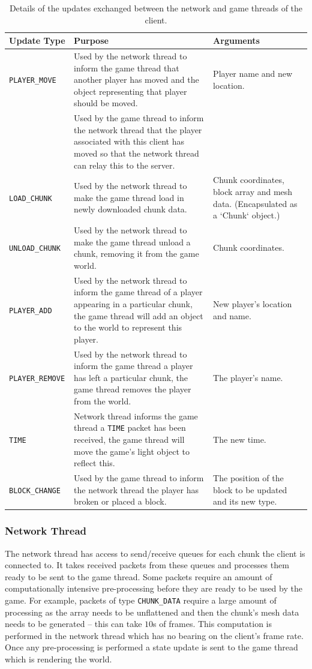 \documentclass[10pt,twoside,notitlepage,a4paper]{report}
\begin{document}
	\begin{table}
		\begin{tabularx}{\textwidth}{| l | X | p{3cm} |}
			\hline
			\bf Update Type & Purpose & Arguments \\
			\hline
			\tt PLAYER\_MOVE & Used by the network thread to inform the game thread that another player has moved and the object representing that player should be moved. & Player name and new location.\\
			\cline{2-2}
			\tt & Used by the game thread to inform the network thread that the player associated with this client has moved so that the network thread can relay this to the server. & \\
			\hline
			\tt LOAD\_CHUNK & Used by the network thread to make the game thread load in newly downloaded chunk data. & Chunk coordinates, block array and mesh data. (Encapsulated as a `Chunk` object.) \\
			\hline
			\tt UNLOAD\_CHUNK & Used by the network thread to make the game thread unload a chunk, removing it from the game world. & Chunk coordinates. \\
			\hline
			\tt PLAYER\_ADD & Used by the network thread to inform the game thread of a player appearing in a particular chunk, the game thread will add an object to the world to represent this player. & New player's location and name. \\
			\hline
			\tt PLAYER\_REMOVE & Used by the network thread to inform the game thread a player has left a particular chunk, the game thread removes the player from the world. & The player's name. \\
			\hline
			\tt TIME & Network thread informs the game thread a \texttt{TIME} packet has been received, the game thread will move the game's light object to reflect this. & The new time. \\
			\hline
			\tt BLOCK\_CHANGE & Used by the game thread to inform the network thread the player has broken or placed a block. & The position of the block to be updated and its new type.\\
			\hline
		\end{tabularx}
		\caption{Details of the updates exchanged between the network and game threads of the client.}
		\label{tab:updates}
	\end{table}
	
	\subsubsection{Network Thread}
	The network thread has access to send/receive queues for each chunk the client is connected to. It takes received packets from these queues and processes them ready to be sent to the game thread. Some packets require an amount of computationally intensive pre-processing before they are ready to be used by the game. For example, packets of type \texttt{CHUNK\_DATA} require a large amount of processing as the array needs to be unflattened and then the chunk's mesh data needs to be generated -- this can take $10$s of frames. This computation is performed in the network thread which has no bearing on the client's frame rate. Once any pre-processing is performed a state update is sent to the game thread which is rendering the world.
	
\end{document}

